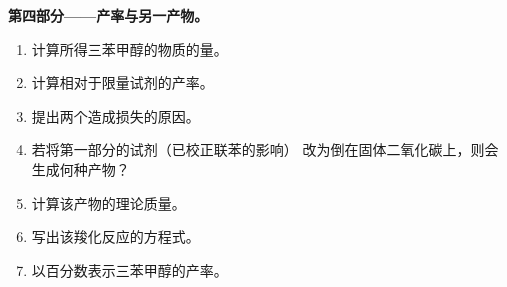 \begin{problem}
\medskip
\noindent\textbf{第四部分——产率与另一产物。}
\begin{enumerate}[resume]
  \item 计算所得三苯甲醇的物质的量。
  \item 计算相对于限量试剂的产率。
  \item 提出两个造成损失的原因。
  \item 若将第一部分的试剂（已校正联苯的影响）
        改为倒在固体二氧化碳上，则会生成何种产物？
  \item 计算该产物的理论质量。
  \item 写出该羧化反应的方程式。
  \item 以百分数表示三苯甲醇的产率。
\end{enumerate}
\end{problem}
